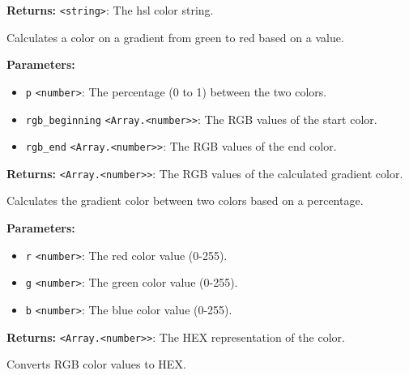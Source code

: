 \documentclass[12pt,a4paper]{article}
\begin{document}
\noindent \textbf{Returns:} \texttt{<string>}: The hsl color string.

\noindent Calculates a color on a gradient from green to red based on a value.

\vspace{5mm}
\noindent {}


\noindent \textbf{Parameters:}
\begin{itemize}
  \item \texttt{p} \texttt{<number>}: The percentage (0 to 1) between the two colors.
  \item \texttt{rgb\_beginning} \texttt{<Array.<number>>}: The RGB values of the start color.
  \item \texttt{rgb\_end} \texttt{<Array.<number>>}: The RGB values of the end color.
\end{itemize}

\noindent \textbf{Returns:} \texttt{<Array.<number>>}: The RGB values of the calculated gradient color.

\noindent Calculates the gradient color between two colors based on a percentage.

\vspace{5mm}
\noindent {}


\noindent \textbf{Parameters:}
\begin{itemize}
  \item \texttt{r} \texttt{<number>}: The red color value (0-255).
  \item \texttt{g} \texttt{<number>}: The green color value (0-255).
  \item \texttt{b} \texttt{<number>}: The blue color value (0-255).
\end{itemize}

\noindent \textbf{Returns:} \texttt{<Array.<number>>}: The HEX representation of the color.

\noindent Converts RGB color values to HEX.

\vspace{5mm}
\noindent {}
\end{document}
